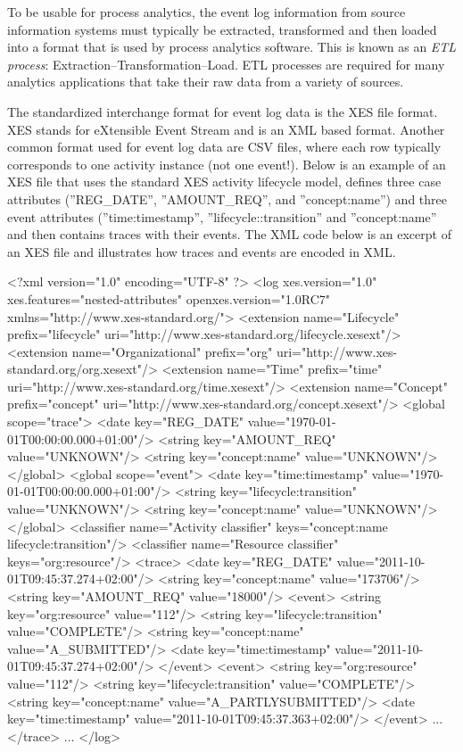 To be usable for process analytics, the event log information from source information systems must typically be extracted, transformed and then loaded into a format that is used by process analytics software. This is known as an \emph{ETL process}: Extraction--Transformation--Load. ETL processes are required for many analytics applications that take their raw data from a variety of sources.

The standardized interchange format for event log data is the XES file format. XES stands for eXtensible Event Stream and is an XML based format. Another common format used for event log data are CSV files, where each row typically corresponds to one activity instance (not one event!). Below is an example of an XES file that uses the standard XES activity lifecycle model, defines three case attributes (''REG\_DATE'', ''AMOUNT\_REQ'', and ''concept:name'') and three event attributes (''time:timestamp'', ''lifecycle::transition'' and ''concept:name'' and then contains traces with their events. The XML code below is an excerpt of an XES file and illustrates how traces and events are encoded in XML.

\begin{xmlcode}
<?xml version="1.0" encoding="UTF-8" ?>
<log xes.version="1.0" xes.features="nested-attributes" 
    openxes.version="1.0RC7" 
    xmlns="http://www.xes-standard.org/">
  <extension name="Lifecycle" prefix="lifecycle" 
    uri="http://www.xes-standard.org/lifecycle.xesext"/>
  <extension name="Organizational" prefix="org" 
    uri="http://www.xes-standard.org/org.xesext"/>
  <extension name="Time" prefix="time" 
    uri="http://www.xes-standard.org/time.xesext"/>
  <extension name="Concept" prefix="concept" 
    uri="http://www.xes-standard.org/concept.xesext"/>
  <global scope="trace">
    <date key="REG_DATE" value="1970-01-01T00:00:00.000+01:00"/>
    <string key="AMOUNT_REQ" value="UNKNOWN"/>
    <string key="concept:name" value="UNKNOWN"/>
  </global>
  <global scope="event">
    <date key="time:timestamp" value="1970-01-01T00:00:00.000+01:00"/>
    <string key="lifecycle:transition" value="UNKNOWN"/>
    <string key="concept:name" value="UNKNOWN"/>
  </global>
  <classifier name="Activity classifier" 
     keys="concept:name lifecycle:transition"/>
  <classifier name="Resource classifier" 
     keys="org:resource"/>
  <trace>
    <date key="REG_DATE" value="2011-10-01T09:45:37.274+02:00"/>
    <string key="concept:name" value="173706"/>
    <string key="AMOUNT_REQ" value="18000"/>
    <event>
      <string key="org:resource" value="112"/>
      <string key="lifecycle:transition" value="COMPLETE"/>
      <string key="concept:name" value="A_SUBMITTED"/>
      <date key="time:timestamp" value="2011-10-01T09:45:37.274+02:00"/>
    </event>
    <event>
      <string key="org:resource" value="112"/>
      <string key="lifecycle:transition" value="COMPLETE"/>
      <string key="concept:name" value="A_PARTLYSUBMITTED"/>
      <date key="time:timestamp" value="2011-10-01T09:45:37.363+02:00"/>
    </event>
    ...
  </trace>
  ...
</log>
\end{xmlcode}

